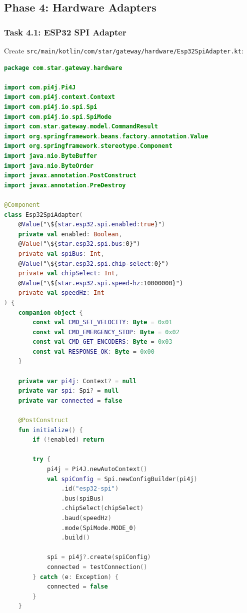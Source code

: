 \subsection{Phase 4: Hardware Adapters}

\subsubsection{Task 4.1: ESP32 SPI Adapter}

Create \texttt{src/main/kotlin/com/star/gateway/hardware/Esp32SpiAdapter.kt}:

\begin{lstlisting}[language=Kotlin, caption=Esp32SpiAdapter.kt]
package com.star.gateway.hardware

import com.pi4j.Pi4J
import com.pi4j.context.Context
import com.pi4j.io.spi.Spi
import com.pi4j.io.spi.SpiMode
import com.star.gateway.model.CommandResult
import org.springframework.beans.factory.annotation.Value
import org.springframework.stereotype.Component
import java.nio.ByteBuffer
import java.nio.ByteOrder
import javax.annotation.PostConstruct
import javax.annotation.PreDestroy

@Component
class Esp32SpiAdapter(
    @Value("\${star.esp32.spi.enabled:true}")
    private val enabled: Boolean,
    @Value("\${star.esp32.spi.bus:0}")
    private val spiBus: Int,
    @Value("\${star.esp32.spi.chip-select:0}")
    private val chipSelect: Int,
    @Value("\${star.esp32.spi.speed-hz:10000000}")
    private val speedHz: Int
) {
    companion object {
        const val CMD_SET_VELOCITY: Byte = 0x01
        const val CMD_EMERGENCY_STOP: Byte = 0x02
        const val CMD_GET_ENCODERS: Byte = 0x03
        const val RESPONSE_OK: Byte = 0x00
    }

    private var pi4j: Context? = null
    private var spi: Spi? = null
    private var connected = false

    @PostConstruct
    fun initialize() {
        if (!enabled) return

        try {
            pi4j = Pi4J.newAutoContext()
            val spiConfig = Spi.newConfigBuilder(pi4j)
                .id("esp32-spi")
                .bus(spiBus)
                .chipSelect(chipSelect)
                .baud(speedHz)
                .mode(SpiMode.MODE_0)
                .build()

            spi = pi4j?.create(spiConfig)
            connected = testConnection()
        } catch (e: Exception) {
            connected = false
        }
    }


\end{lstlisting}

